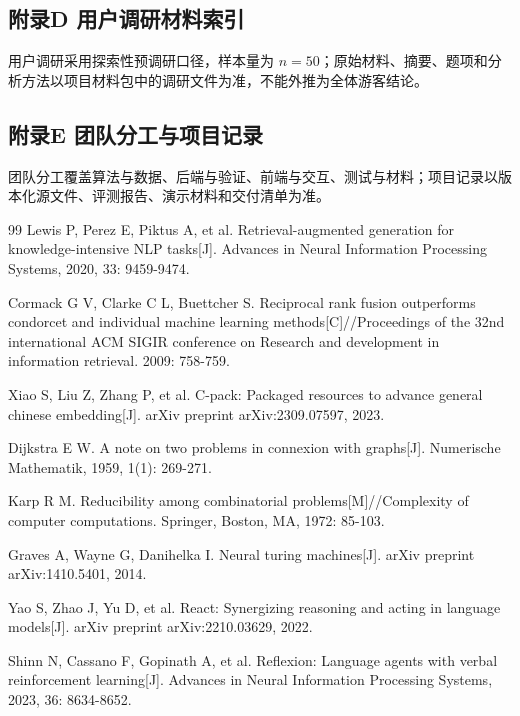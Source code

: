 \documentclass[11pt,a4paper]{ctexart}
\begin{document}
\subsection{附录D 用户调研材料索引}
用户调研采用探索性预调研口径，样本量为 $n=50$；原始材料、摘要、题项和分析方法以项目材料包中的调研文件为准，不能外推为全体游客结论。

\subsection{附录E 团队分工与项目记录}
团队分工覆盖算法与数据、后端与验证、前端与交互、测试与材料；项目记录以版本化源文件、评测报告、演示材料和交付清单为准。

\begin{thebibliography}{99}
Lewis P, Perez E, Piktus A, et al. Retrieval-augmented generation for knowledge-intensive NLP tasks[J]. Advances in Neural Information Processing Systems, 2020, 33: 9459-9474.

Cormack G V, Clarke C L, Buettcher S. Reciprocal rank fusion outperforms condorcet and individual machine learning methods[C]//Proceedings of the 32nd international ACM SIGIR conference on Research and development in information retrieval. 2009: 758-759.

Xiao S, Liu Z, Zhang P, et al. C-pack: Packaged resources to advance general chinese embedding[J]. arXiv preprint arXiv:2309.07597, 2023.

Dijkstra E W. A note on two problems in connexion with graphs[J]. Numerische Mathematik, 1959, 1(1): 269-271.

Karp R M. Reducibility among combinatorial problems[M]//Complexity of computer computations. Springer, Boston, MA, 1972: 85-103.

Graves A, Wayne G, Danihelka I. Neural turing machines[J]. arXiv preprint arXiv:1410.5401, 2014.

Yao S, Zhao J, Yu D, et al. React: Synergizing reasoning and acting in language models[J]. arXiv preprint arXiv:2210.03629, 2022.

Shinn N, Cassano F, Gopinath A, et al. Reflexion: Language agents with verbal reinforcement learning[J]. Advances in Neural Information Processing Systems, 2023, 36: 8634-8652.
\end{thebibliography}
\end{document}
